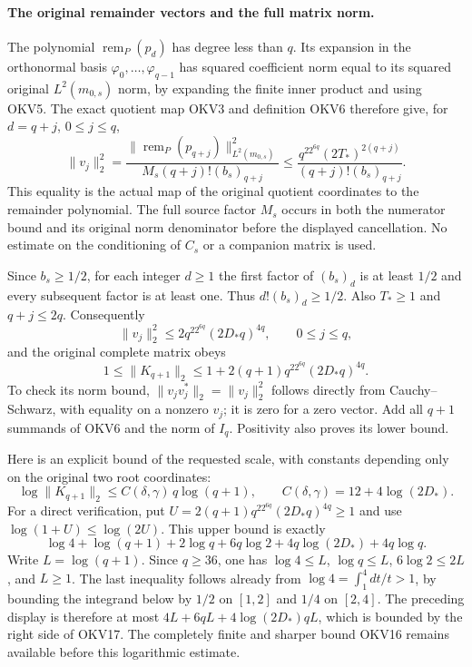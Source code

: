 \documentclass[11pt,a4paper]{article}
\begin{document}
\paragraph{The original remainder vectors and the full matrix norm.}
The polynomial $\operatorname{rem}_P(p_d)$ has degree less than $q$.
Its expansion in the orthonormal basis
$\varphi_0,\ldots,\varphi_{q-1}$ has squared coefficient norm equal
to its squared original $L^2(m_{0,s})$ norm, by expanding the finite
inner product and using OKV5. The exact quotient map OKV3 and
definition OKV6 therefore give, for $d=q+j$, $0\le j\le q$,
\[
 \|v_j\|_2^2
   =\frac{\|\operatorname{rem}_P(p_{q+j})\|_{L^2(m_{0,s})}^2}
                 {M_s(q+j)!(b_s)_{q+j}}
   \le\frac{q^22^{6q}(2T_*)^{2(q+j)}}{(q+j)!(b_s)_{q+j}}.
 \tag{OKV15}
\]
This equality is the actual map of the original quotient coordinates
to the remainder polynomial. The full source factor $M_s$ occurs in
both the numerator bound and its original norm denominator before
the displayed cancellation. No estimate on the conditioning of
$C_s$ or a companion matrix is used.

Since $b_s\ge1/2$, for each integer $d\ge1$ the first factor of
$(b_s)_d$ is at least $1/2$ and every subsequent factor is at least
one. Thus $d!(b_s)_d\ge1/2$. Also $T_*\ge1$ and $q+j\le2q$.
Consequently
\[
 \|v_j\|_2^2\le2q^22^{6q}(2D_*q)^{4q},\qquad0\le j\le q,
\]
and the original complete matrix obeys
\[
 \boxed{1\le\|K_{q+1}\|_2\le
   1+2(q+1)q^22^{6q}(2D_*q)^{4q}.}
 \tag{OKV16}
\]
To check its norm bound, $\|v_jv_j^*\|_2=\|v_j\|_2^2$
follows directly from Cauchy--Schwarz, with equality on a nonzero
$v_j$; it is zero for a zero vector. Add all $q+1$ summands of
OKV6 and the norm of $I_q$. Positivity also proves its lower bound.

Here is an explicit bound of the requested scale, with constants
depending only on the original two root coordinates:
\[
 \boxed{\log\|K_{q+1}\|_2
       \le C(\delta,\gamma)\,q\log(q+1),\qquad
 C(\delta,\gamma)=12+4\log(2D_*).}
 \tag{OKV17}
\]
For a direct verification, put
$U=2(q+1)q^22^{6q}(2D_*q)^{4q}\ge1$ and use
$\log(1+U)\le\log(2U)$. This upper bound is exactly
\[
 \log4+\log(q+1)+2\log q+6q\log2
       +4q\log(2D_*)+4q\log q.
\]
Write $L=\log(q+1)$. Since $q\ge36$, one has
$\log4\le L$, $\log q\le L$, $6\log2\le2L$, and $L\ge1$.
The last inequality follows already from
$\log4=\int_1^4dt/t>1$, by bounding the integrand below by
$1/2$ on $[1,2]$ and $1/4$ on $[2,4]$.
The preceding display is therefore at most
$4L+6qL+4\log(2D_*)qL$, which is bounded by the right side
of OKV17. The completely finite and sharper bound OKV16 remains
available before this logarithmic estimate.
\end{document}
